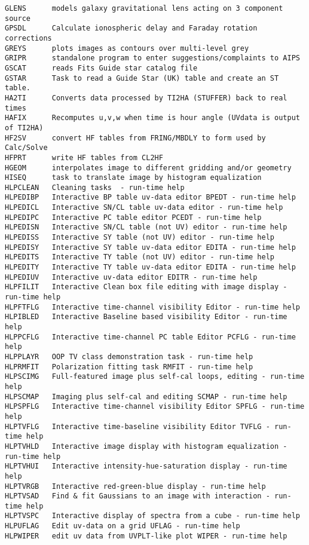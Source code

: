 \begin{verbatim}
GLENS      models galaxy gravitational lens acting on 3 component source
GPSDL      Calculate ionospheric delay and Faraday rotation corrections
GREYS      plots images as contours over multi-level grey
GRIPR      standalone program to enter suggestions/complaints to AIPS
GSCAT      reads Fits Guide star catalog file
GSTAR      Task to read a Guide Star (UK) table and create an ST table.
HA2TI      Converts data processed by TI2HA (STUFFER) back to real times
HAFIX      Recomputes u,v,w when time is hour angle (UVdata is output of TI2HA)
HF2SV      convert HF tables from FRING/MBDLY to form used by Calc/Solve
HFPRT      write HF tables from CL2HF
HGEOM      interpolates image to different gridding and/or geometry
HISEQ      task to translate image by histogram equalization
HLPCLEAN   Cleaning tasks  - run-time help
HLPEDIBP   Interactive BP table uv-data editor BPEDT - run-time help
HLPEDICL   Interactive SN/CL table uv-data editor - run-time help
HLPEDIPC   Interactive PC table editor PCEDT - run-time help
HLPEDISN   Interactive SN/CL table (not UV) editor - run-time help
HLPEDISS   Interactive SY table (not UV) editor - run-time help
HLPEDISY   Interactive SY table uv-data editor EDITA - run-time help
HLPEDITS   Interactive TY table (not UV) editor - run-time help
HLPEDITY   Interactive TY table uv-data editor EDITA - run-time help
HLPEDIUV   Interactive uv-data editor EDITR - run-time help
HLPFILIT   Interactive Clean box file editing with image display - run-time help
HLPFTFLG   Interactive time-channel visibility Editor - run-time help
HLPIBLED   Interactive Baseline based visibility Editor - run-time help
HLPPCFLG   Interactive time-channel PC table Editor PCFLG - run-time help
HLPPLAYR   OOP TV class demonstration task - run-time help
HLPRMFIT   Polarization fitting task RMFIT - run-time help
HLPSCIMG   Full-featured image plus self-cal loops, editing - run-time help
HLPSCMAP   Imaging plus self-cal and editing SCMAP - run-time help
HLPSPFLG   Interactive time-channel visibility Editor SPFLG - run-time help
HLPTVFLG   Interactive time-baseline visibility Editor TVFLG - run-time help
HLPTVHLD   Interactive image display with histogram equalization - run-time help
HLPTVHUI   Interactive intensity-hue-saturation display - run-time help
HLPTVRGB   Interactive red-green-blue display - run-time help
HLPTVSAD   Find & fit Gaussians to an image with interaction - run-time help
HLPTVSPC   Interactive display of spectra from a cube - run-time help
HLPUFLAG   Edit uv-data on a grid UFLAG - run-time help
HLPWIPER   edit uv data from UVPLT-like plot WIPER - run-time help

\end{verbatim}
